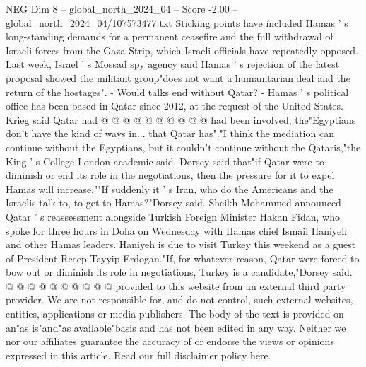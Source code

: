 \begin{textsample}{NEG Dim 8 – global\_north\_2024\_04 – Score -2.00 – global\_north\_2024\_04/107573477.txt}
Sticking points have included Hamas ' s long-standing demands for a permanent ceasefire and the full withdrawal of Israeli forces from the Gaza Strip, which Israeli officials have repeatedly opposed.
Last week, Israel ' s Mossad spy agency said Hamas ' s rejection of the latest proposal showed the militant group"does not want a humanitarian deal and the return of the hostages". - Would talks end without Qatar? - Hamas ' s political office has been based in Qatar since 2012, at the request of the United States.
Krieg said Qatar had @ @ @ @ @ @ @ @ @ @ had been involved, the"Egyptians don't have the kind of ways in... that Qatar has"."I think the mediation can continue without the Egyptians, but it couldn't continue without the Qataris,"the King ' s College London academic said.
Dorsey said that"if Qatar were to diminish or end its role in the negotiations, then the pressure for it to expel Hamas will increase.""If suddenly it ' s Iran, who do the Americans and the Israelis talk to, to get to Hamas?"Dorsey said.
Sheikh Mohammed announced Qatar ' s reassessment alongside Turkish Foreign Minister Hakan Fidan, who spoke for three hours in Doha on Wednesday with Hamas chief Ismail Haniyeh and other Hamas leaders.
Haniyeh is due to visit Turkey this weekend as a guest of President Recep Tayyip Erdogan."If, for whatever reason, Qatar were forced to bow out or diminish its role in negotiations, Turkey is a candidate,"Dorsey said. @ @ @ @ @ @ @ @ @ @ provided to this website from an external third party provider.
We are not responsible for, and do not control, such external websites, entities, applications or media publishers.
The body of the text is provided on an"as is"and"as available"basis and has not been edited in any way.
Neither we nor our affiliates guarantee the accuracy of or endorse the views or opinions expressed in this article.
Read our full disclaimer policy here.

\end{textsample}
